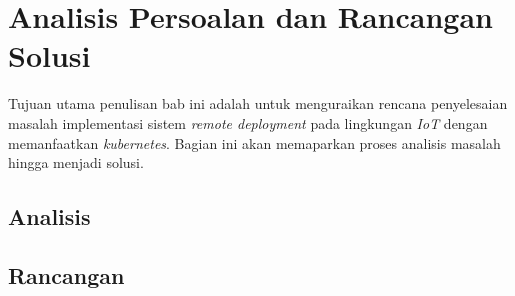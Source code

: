 \chapter{Analisis Persoalan dan Rancangan Solusi}

Tujuan utama penulisan bab ini adalah untuk menguraikan rencana penyelesaian masalah implementasi sistem \textit{remote deployment} pada lingkungan \textit{IoT} dengan memanfaatkan \textit{kubernetes}. Bagian ini akan memaparkan proses analisis masalah hingga menjadi solusi.


\section{Analisis}







\section{Rancangan}





